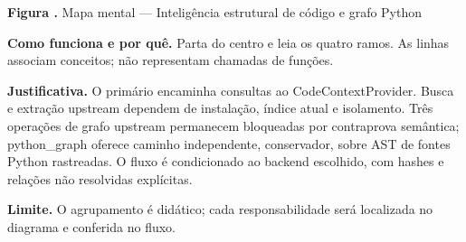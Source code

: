 {\small\textbf{Figura \thefigure.} Mapa mental --- Inteligência estrutural de código e grafo Python}\par\smallskip
\noindent\textbf{Como funciona e por quê.} Parta do centro e leia os quatro ramos. As linhas associam conceitos; não representam chamadas de funções.\par
\noindent\textbf{Justificativa.} O primário encaminha consultas ao CodeContextProvider. Busca e extração upstream dependem de instalação, índice atual e isolamento. Três operações de grafo upstream permanecem bloqueadas por contraprova semântica; python\_graph oferece caminho independente, conservador, sobre AST de fontes Python rastreadas. O fluxo é condicionado ao backend escolhido, com hashes e relações não resolvidas explícitas.\par
\noindent\textbf{Limite.} O agrupamento é didático; cada responsabilidade será localizada no diagrama e conferida no fluxo.\par\smallskip
{}

